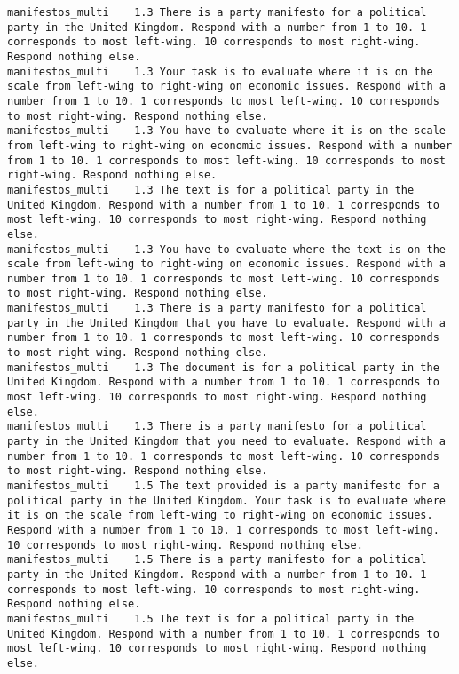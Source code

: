 \begin{lstlisting}[label=lst:promptvariants]
manifestos_multi	1.3	There is a party manifesto for a political party in the United Kingdom. Respond with a number from 1 to 10. 1 corresponds to most left-wing. 10 corresponds to most right-wing. Respond nothing else.
manifestos_multi	1.3	Your task is to evaluate where it is on the scale from left-wing to right-wing on economic issues. Respond with a number from 1 to 10. 1 corresponds to most left-wing. 10 corresponds to most right-wing. Respond nothing else.
manifestos_multi	1.3	You have to evaluate where it is on the scale from left-wing to right-wing on economic issues. Respond with a number from 1 to 10. 1 corresponds to most left-wing. 10 corresponds to most right-wing. Respond nothing else.
manifestos_multi	1.3	The text is for a political party in the United Kingdom. Respond with a number from 1 to 10. 1 corresponds to most left-wing. 10 corresponds to most right-wing. Respond nothing else.
manifestos_multi	1.3	You have to evaluate where the text is on the scale from left-wing to right-wing on economic issues. Respond with a number from 1 to 10. 1 corresponds to most left-wing. 10 corresponds to most right-wing. Respond nothing else.
manifestos_multi	1.3	There is a party manifesto for a political party in the United Kingdom that you have to evaluate. Respond with a number from 1 to 10. 1 corresponds to most left-wing. 10 corresponds to most right-wing. Respond nothing else.
manifestos_multi	1.3	The document is for a political party in the United Kingdom. Respond with a number from 1 to 10. 1 corresponds to most left-wing. 10 corresponds to most right-wing. Respond nothing else.
manifestos_multi	1.3	There is a party manifesto for a political party in the United Kingdom that you need to evaluate. Respond with a number from 1 to 10. 1 corresponds to most left-wing. 10 corresponds to most right-wing. Respond nothing else.
manifestos_multi	1.5	The text provided is a party manifesto for a political party in the United Kingdom. Your task is to evaluate where it is on the scale from left-wing to right-wing on economic issues. Respond with a number from 1 to 10. 1 corresponds to most left-wing. 10 corresponds to most right-wing. Respond nothing else.
manifestos_multi	1.5	There is a party manifesto for a political party in the United Kingdom. Respond with a number from 1 to 10. 1 corresponds to most left-wing. 10 corresponds to most right-wing. Respond nothing else.
manifestos_multi	1.5	The text is for a political party in the United Kingdom. Respond with a number from 1 to 10. 1 corresponds to most left-wing. 10 corresponds to most right-wing. Respond nothing else.

\end{lstlisting}
